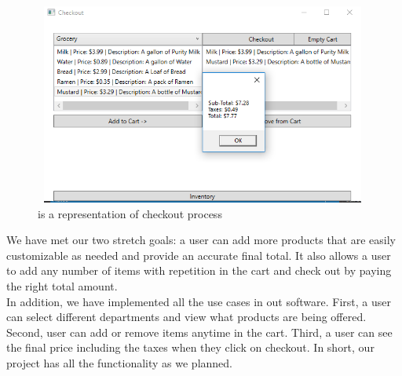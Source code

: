 \documentclass[10pt,conference,onecolumn,compsoc]{IEEEtran}
\begin{document}
\begin{figure}[H]
\includegraphics[height=250px, width=420px]{checkout.png}
\caption{is a representation of checkout process}
\label{checkout}
\end{figure}



We have met our two stretch goals: a user can add more products that are easily customizable as needed and provide an accurate final total. It also allows a user to add any number of items with repetition in the cart and check out by paying the right total amount. \\



In addition, we have implemented all the use cases in out software. First, a user can select different departments and view what products are being offered. Second, user can add or remove items anytime in the cart. Third, a user can see the final price including the taxes when they click on checkout. In short, our project has all the functionality as we planned. 
\end{document}

